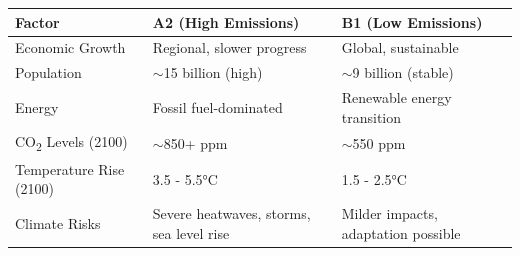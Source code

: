 \begin{table}[htbp]
\centering
{}
\label{tab:ipcc_scenarios}
\small
\begin{tabular}{L{3cm}L{4.5cm}L{4.5cm}}
\toprule
\textbf{Factor} & \textbf{A2 (High Emissions)} & \textbf{B1 (Low Emissions)} \\
\midrule
Economic Growth & Regional, slower progress & Global, sustainable \\
Population & $\sim$15 billion (high) & $\sim$9 billion (stable) \\
Energy & Fossil fuel-dominated & Renewable energy transition \\
CO\textsubscript{2} Levels (2100) & $\sim$850+ ppm & $\sim$550 ppm \\
Temperature Rise (2100) & 3.5 - 5.5°C & 1.5 - 2.5°C \\
Climate Risks & Severe heatwaves, storms, sea level rise & Milder impacts, adaptation possible \\
\bottomrule
\end{tabular}
\end{table}
